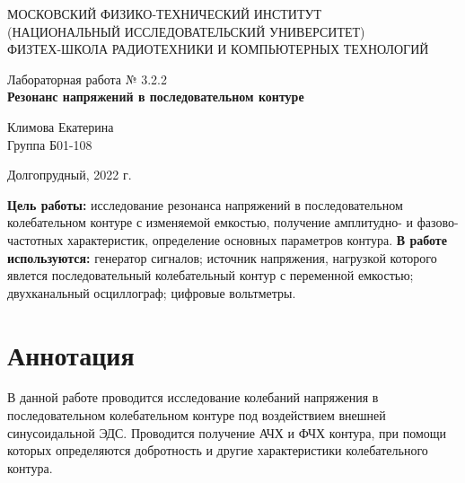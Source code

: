\documentclass[a4paper,12pt]{article} %
\begin{document}
\begin{center}
	\footnotesize{МОСКОВСКИЙ ФИЗИКО-ТЕХНИЧЕСКИЙ ИНСТИТУТ\\(НАЦИОНАЛЬНЫЙ 			ИССЛЕДОВАТЕЛЬСКИЙ УНИВЕРСИТЕТ)}\\
	\footnotesize{ФИЗТЕХ-ШКОЛА РАДИОТЕХНИКИ И КОМПЬЮТЕРНЫХ ТЕХНОЛОГИЙ\\}
	\hfill \break
	\hfill \break
	\hfill \break
	\hfill \break
	\hfill \break
	\hfill \break
\end{center}

\begin{center}   
    \hfill \break
	\hfill \break
	\hfill \break
	\hfill \break
	\hfill \break
	\hfill \break
	\hfill \break
	\hfill \break
	\hfill \break
	\hfill \break
	\hfill \break
	\large{Лабораторная работа № 3.2.2\\\large{\textbf{Резонанс напряжений в последовательном контуре}}}\\
	\hfill \break
	\hfill \break
	\hfill \break
	\hfill \break
	\hfill \break
	\hfill \break
	\hfill \break
	\hfill \break
	\hfill \break
	\hfill \break
	\hfill \break
	\begin{flushright}
		Климова Екатерина\\
		Группа Б01-108
	\end{flushright}
	\hfill \break
\end{center}
\hfill \break
\hfill \break
\begin{center}
	Долгопрудный, 2022 г.
\end{center}
\thispagestyle{empty}

\newpage
\hfill \break
\textbf{Цель работы:} исследование резонанса напряжений в последовательном колебательном контуре с изменяемой емкостью, получение амплитудно- и фазово-частотных характеристик, определение основных параметров контура.
\hfill \break
\hfill \break
\textbf{В работе используются:} генератор сигналов; источник напряжения, нагрузкой которого явлется последовательный колебательный контур с переменной емкостью; двухканальный осциллограф; цифровые вольтметры.

\section{Аннотация}
\hfill \break В данной работе проводится исследование колебаний напряжения в последовательном колебательном контуре под воздействием внешней синусоидальной ЭДС. Проводится получение АЧХ и ФЧХ контура, при помощи которых определяются добротность и другие характеристики колебательного контура.
\end{document}
